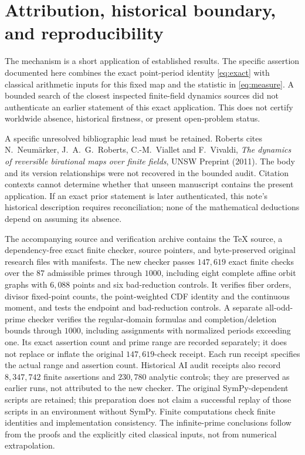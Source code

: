 \documentclass[11pt]{article}
\theoremstyle{remark}
\begin{document}
\section{Attribution, historical boundary, and reproducibility}
The mechanism is a short application of established results. The
specific assertion documented here combines the exact point-period
identity \eqref{eq:exact} with classical arithmetic inputs for this
fixed map and the statistic in \eqref{eq:measure}. A bounded search
of the closest inspected finite-field dynamics sources did not
authenticate an earlier statement of this exact application. This
does not certify worldwide absence, historical firstness, or present
open-problem status.

A specific unresolved bibliographic lead must be retained.
Roberts \cite[p.220, reference 9]{R} cites N.~Neum\"arker,
J.~A.~G.~Roberts, C.-M.~Viallet and F.~Vivaldi,
\emph{The dynamics of reversible birational maps over finite fields},
UNSW Preprint (2011). The body and its version relationships were
not recovered in the bounded audit. Citation contexts cannot
determine whether that unseen manuscript contains the present
application. If an exact prior statement is later authenticated,
this note's historical description requires reconciliation; none
of the mathematical deductions depend on assuming its absence.

The accompanying source and verification archive contains the TeX
source, a dependency-free exact finite checker, source pointers,
and byte-preserved original research files with manifests. The
new checker passes $147{,}619$ exact finite checks over the $87$
admissible primes through $1000$, including eight complete affine orbit
graphs with $6{,}088$ points and six bad-reduction controls. It verifies
fiber orders, divisor fixed-point counts, the
point-weighted CDF identity and the continuous moment, and tests
the endpoint and bad-reduction controls. A separate all-odd-prime checker
verifies the regular-domain formulas and completion/deletion bounds through
$1000$, including assignments with normalized periods exceeding one.
Its exact assertion count and prime range are recorded separately; it does
not replace or inflate the original $147{,}619$-check receipt. Each run receipt specifies
the actual range and assertion count. Historical AI audit receipts
also record $8{,}347{,}742$ finite assertions and $230{,}780$ analytic
controls; they are preserved as earlier runs, not attributed to the
new checker. The original SymPy-dependent scripts are retained;
this preparation does not claim a successful replay of those scripts
in an environment without SymPy. Finite computations check finite
identities and implementation consistency. The infinite-prime
conclusions follow from the proofs and the explicitly cited
classical inputs, not from numerical extrapolation.
\end{document}
